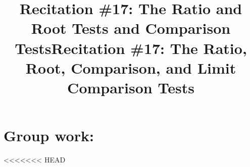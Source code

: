 \documentclass[handout]{ximera}
\title{Recitation \#17: The Ratio and Root Tests and Comparison Tests}
\title{Recitation \#17: The Ratio, Root, Comparison, and Limit Comparison Tests}
\begin{document}
\begin{abstract}		\end{abstract}
\maketitle












\section{Group work:}

<<<<<<< HEAD


%	
%	
%	
%	
%	
%		
%		
%		
%		
%		
%		
%		
%		
%		
%		
%		
\end{document}
